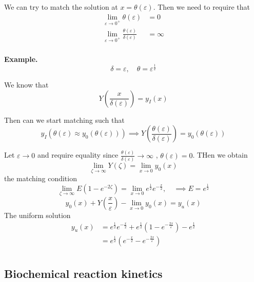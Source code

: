 \documentclass{article}
\theoremstyle{remark}
\newcommand{\newpara}
  {
  \vskip 0.4cm
  }
\begin{document}
\begin{enumerate}[label=(\roman*)]
We can try to match the solution at $x = \theta \left( \varepsilon  \right)$. Then we need to require that \[
  \begin{split}
\lim_{\varepsilon  \to  0^{+}}  \theta \left( \varepsilon  \right)   & = 0 \\
\lim_{\varepsilon \to 0^{+}} \frac{\theta \left( \varepsilon  \right)}{\delta \left( \varepsilon  \right)}  &= \infty \\
  \end{split} 
\] 
\begin{tcolorbox}
\textbf{Example.} 
\[
\delta  =\varepsilon , \quad  \theta = \varepsilon ^{\frac{1}{2}} 
\] 
\end{tcolorbox}



\newpara
We know that \[
Y\left( \frac{x}{\delta \left( \varepsilon  \right)} \right) = y_{I} \left( x \right)
\] 

Then can we start matching such that \[
y_{I}\left( \theta \left( \varepsilon  \right) \approx y_{0}\left( \theta \left( \varepsilon  \right) \right) \right) \implies  Y\left( \frac{\theta \left( \varepsilon  \right)}{\delta \left( \varepsilon  \right)}  \right) = y_{0}\left( \theta \left( \varepsilon  \right) \right)
\] 


Let $\varepsilon  \to  0$ and require equality since $\frac{\theta \left( \varepsilon  \right)}{\delta  \left( \varepsilon  \right) } \to \infty $ , $\theta \left( \varepsilon  \right) = 0$.  THen we obtain \[
\lim_{\zeta \to \infty}  Y\left( \zeta  \right) = \lim_{x\to 0} y_{0}\left( x \right)
\] 
the matching condition \[
\lim_{\zeta \to  \infty}  E\left( 1- e^{-2\zeta } \right) = \lim_{x \to  0}  e^{\frac{1}{2}} e^{-\frac{x}{2}} , \quad  \implies  E = e^{\frac{1}{2}} 
\] 
\[
y_{0}\left( x \right) + Y\left( \frac{x}{\varepsilon } \right) - \lim_{x\to 0} y_{0}\left( x \right) = y_{u}\left( x \right)
\] 
The uniform solution  \[
  \begin{split}
 y_{u}\left( x \right)  & = e^{\frac{1}{2}} e^{-\frac{x}{2}} + e^{\frac{1}{2}} \left( 1- e^{-\frac{2x}{\varepsilon }} \right) - e^{\frac{1}{2}} \\
 &= e^{\frac{1}{2}} \left( e^{-\frac{x}{2}} - e^{-\frac{2x}{\varepsilon }} \right) \\
  \end{split} 
\] 

\subsection{Biochemical reaction kinetics}%
\label{sub:biochemical_reaction_kinetics}


\end{enumerate}
\end{document}
